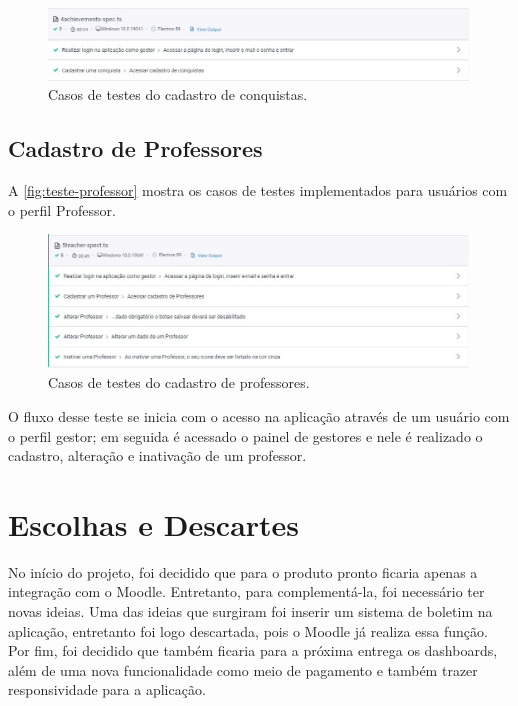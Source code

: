 \documentclass[
    12pt,               %
    openright,          %
    oneside,
    a4paper,            %
    english,            %
    brazil              %
    ]{ifsp-spo-inf-ctds} %
\begin{document}
\begin{figure}[htb]
    \centering
	\includegraphics[width=16cm]{imagens/TesteConquista.JPG}
	\caption{\label{fig:teste-conquista} Casos de testes do cadastro de conquistas.}
\end{figure}

\subsection{Cadastro de Professores}
A \autoref{fig:teste-professor} mostra os casos de testes implementados para usuários com o perfil Professor. 

\begin{figure}[htb]
    \centering
	\includegraphics[width=16cm]{imagens/TesteProfessor.JPG}
	\caption{\label{fig:teste-professor} Casos de testes do cadastro de professores.}
\end{figure}

O fluxo desse teste se inicia com o acesso na aplicação através de um usuário com o perfil gestor; em seguida é acessado o painel de gestores e nele é realizado o cadastro, alteração e inativação de um professor.

\section{Escolhas e Descartes}
No início do projeto, foi decidido que para o produto pronto ficaria apenas a integração com o Moodle. Entretanto, para complementá-la, foi necessário ter novas ideias. Uma das ideias que surgiram foi inserir um sistema de boletim na aplicação, entretanto foi logo descartada, pois o Moodle já realiza essa função. Por fim, foi decidido que também ficaria para a próxima entrega os dashboards, além de uma nova funcionalidade como meio de pagamento e também trazer responsividade para a aplicação.  
\end{document}
